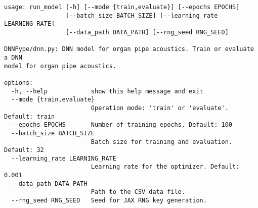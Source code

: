 \begin{code}
\label{code:example}
\begin{verbatim}
usage: run_model [-h] [--mode {train,evaluate}] [--epochs EPOCHS]
                 [--batch_size BATCH_SIZE] [--learning_rate LEARNING_RATE]
                 [--data_path DATA_PATH] [--rng_seed RNG_SEED]

DNNPype/dnn.py: DNN model for organ pipe acoustics. Train or evaluate a DNN
model for organ pipe acoustics.

options:
  -h, --help            show this help message and exit
  --mode {train,evaluate}
                        Operation mode: 'train' or 'evaluate'. Default: train
  --epochs EPOCHS       Number of training epochs. Default: 100
  --batch_size BATCH_SIZE
                        Batch size for training and evaluation. Default: 32
  --learning_rate LEARNING_RATE
                        Learning rate for the optimizer. Default: 0.001
  --data_path DATA_PATH
                        Path to the CSV data file.
  --rng_seed RNG_SEED   Seed for JAX RNG key generation.
\end{verbatim}
\end{code}
